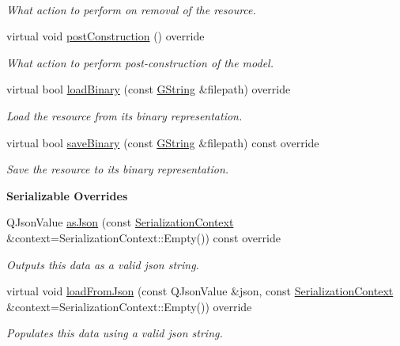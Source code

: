 \begin{Indent}
\begin{DoxyCompactItemize}
$$\begin{DoxyCompactList}\small\item\em What action to perform on removal of the resource. \end{DoxyCompactList}\item 
virtual void \mbox{\hyperlink{classrev_1_1_model_a30a84dac2ff91c87bf920dd3a68411e5}{post\+Construction}} () override
\begin{DoxyCompactList}\small\item\em What action to perform post-\/construction of the model. \end{DoxyCompactList}\item 
virtual bool \mbox{\hyperlink{classrev_1_1_model_aa61390d068bc81cd1d28c8bf44c88008}{load\+Binary}} (const \mbox{\hyperlink{classrev_1_1_g_string}{G\+String}} \&filepath) override
\begin{DoxyCompactList}\small\item\em Load the resource from its binary representation. \end{DoxyCompactList}\item 
virtual bool \mbox{\hyperlink{classrev_1_1_model_a2ca39792d2c6fbd73ca726a6145041ad}{save\+Binary}} (const \mbox{\hyperlink{classrev_1_1_g_string}{G\+String}} \&filepath) const override
\begin{DoxyCompactList}\small\item\em Save the resource to its binary representation. \end{DoxyCompactList}\end{DoxyCompactItemize}
\end{Indent}
\begin{Indent}\textbf{ Serializable Overrides}\par
\begin{DoxyCompactItemize}
\item 
\mbox{\label{classrev_1_1_model_a58700632e50e5d24f7ff0075e5dc9c0f}} 
Q\+Json\+Value \mbox{\hyperlink{classrev_1_1_model_a58700632e50e5d24f7ff0075e5dc9c0f}{as\+Json}} (const \mbox{\hyperlink{structrev_1_1_serialization_context}{Serialization\+Context}} \&context=Serialization\+Context\+::\+Empty()) const override
\begin{DoxyCompactList}\small\item\em Outputs this data as a valid json string. \end{DoxyCompactList}\item 
\mbox{\label{classrev_1_1_model_a91836efa1680574409121adbd0be326f}} 
virtual void \mbox{\hyperlink{classrev_1_1_model_a91836efa1680574409121adbd0be326f}{load\+From\+Json}} (const Q\+Json\+Value \&json, const \mbox{\hyperlink{structrev_1_1_serialization_context}{Serialization\+Context}} \&context=Serialization\+Context\+::\+Empty()) override
\begin{DoxyCompactList}\small\item\em Populates this data using a valid json string. \end{DoxyCompactList}\end{DoxyCompactItemize}
\end{Indent}
